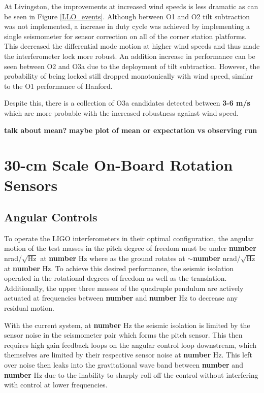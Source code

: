 \documentclass [12pt, proquest]{uwthesis}[2019]
\begin{document}
At Livingston, the improvements at increased wind speeds is less dramatic as can be seen in Figure \ref{LLO_events}. Although between O1 and O2 tilt subtraction was not implemented, a increase in duty cycle was achieved by implementing a single seismometer for sensor correction on all of the corner station platforms. This decreased the differential mode motion at higher wind speeds and thus made the interferometer lock more robust. An addition increase in performance can be seen between O2 and O3a due to the deployment of tilt subtraction. However, the probability of being locked still dropped monotonically with wind speed, similar to the O1 performance of Hanford.

Despite this, there is a collection of O3a candidates detected between \textbf{3-6 m/s} which are more probable with the increased robustness against wind speed.

\textbf{talk about mean?}
\textbf{maybe plot of mean or expectation vs observing run}

\chapter{30-cm Scale On-Board Rotation Sensors}
\section{Angular Controls}
To operate the LIGO interferometers in their optimal configuration, the angular motion of the test masses in the pitch degree of freedom must be under \textbf{number} nrad/$\sqrt{\text{Hz}}$ at \textbf{number} Hz where as the ground rotates at $\sim$\textbf{number} nrad/$\sqrt{\text{Hz}}$ at \textbf{number} Hz. To achieve this desired performance, the seismic isolation operated in the rotational degrees of freedom as well as the translation. Additionally, the upper three masses of the quadruple pendulum are actively actuated at frequencies between \textbf{number} and \textbf{number} Hz to decrease any residual motion.

With the current system, at \textbf{number} Hz the seismic isolation is limited by the sensor noise in the seismometer pair which forms the pitch sensor. This then requires high gain feedback loops on the angular control loop downstream, which themselves are limited by their respective sensor noise at \textbf{number} Hz. This left over noise then leaks into the gravitational wave band between \textbf{number} and \textbf{number} Hz due to the inability to sharply roll off the control without interfering with control at lower frequencies.
\end{document}
